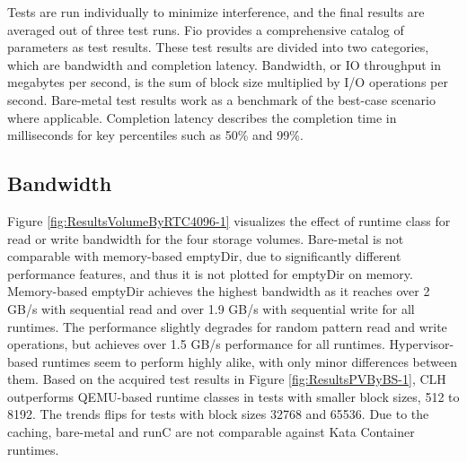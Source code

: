 Tests are run individually to minimize interference, and the final results are averaged out of three test runs. Fio provides a comprehensive catalog of parameters as test results. These test results are divided into two categories, which are bandwidth and completion latency. Bandwidth, or IO throughput in megabytes per second, is the sum of block size multiplied by I/O operations per second. Bare-metal test results work as a benchmark of the best-case scenario where applicable. Completion latency describes the completion time in milliseconds for key percentiles such as 50\% and 99\%. 

\subsection{Bandwidth}

Figure \ref{fig:ResultsVolumeByRTC4096-1} visualizes the effect of runtime class for read or write bandwidth for the four storage volumes. Bare-metal is not comparable with memory-based emptyDir, due to significantly different performance features, and thus it is not plotted for emptyDir on memory. Memory-based emptyDir achieves the highest bandwidth as it reaches over 2 GB/s with sequential read and over 1.9 GB/s with sequential write for all runtimes. The performance slightly degrades for random pattern read and write operations, but achieves over 1.5 GB/s performance for all runtimes. Hypervisor-based runtimes seem to perform highly alike, with only minor differences between them. Based on the acquired test results in Figure \ref{fig:ResultsPVByBS-1}, CLH outperforms QEMU-based runtime classes in tests with smaller block sizes, 512 to 8192. The trends flips for tests with block sizes 32768 and 65536. Due to the caching, bare-metal and runC are not comparable against Kata Container runtimes.

